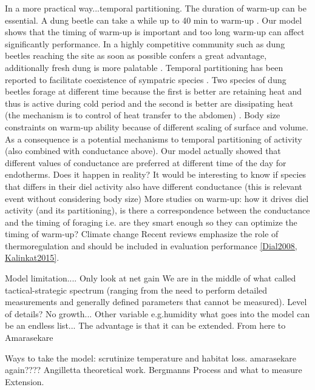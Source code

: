 In a more practical way...temporal partitioning. The duration of warm-up can be essential.
A dung beetle can take a while up to 40 min to warm-up \citep{Verdu2008}.
Our  model shows that the timing of warm-up is important and too long warm-up can affect significantly performance.
In a highly competitive community such as dung beetles reaching the site as soon as possible confers a great advantage, additionally fresh dung is more palatable \citep{Hanski1991}.
Temporal partitioning has been reported to facilitate coexistence of sympatric species \citep{Verdu2007, Verdu2012}.
Two species of dung beetles forage at different time because the first is better are retaining heat and thus is active during cold period and the second is better are dissipating heat (the mechanism is to control of heat transfer to the abdomen) \citep{Verdu2012}.
Body size constraints on warm-up ability because of different scaling of surface and volume.
As a consequence is a potential mechanisms to temporal partitioning of activity (also combined with conductance above).
Our model actually showed that different values of conductance are preferred at different time of the day for endotherms.
Does it happen in reality? %
It would be interesting to know if species that differs in their diel activity also have different conductance (this is relevant event without considering body size)  
More studies on warm-up: how it drives diel activity (and its partitioning), is there a correspondence between the conductance and the timing of foraging i.e. are they smart enough so they can optimize the timing of warm-up? 
Climate change
Recent reviews emphasize the role of thermoregulation and should be included in evaluation performance \cref{Dial2008, Kalinkat2015}.




Model limitation....
Only look at net gain
We are in the middle of what \citet{Hooling1966} called tactical-strategic spectrum (ranging from the need to perform detailed measurements and generally defined parameters that cannot be measured).
Level of details?
No growth...
Other variable e.g.humidity
what goes into the model can be an endless list...
The advantage is that it can be extended.
From here to Amarasekare

Ways to take the model:
scrutinize
temperature and habitat loss.
amarasekare again???? Angilletta theoretical work.
Bergmanns
Process and what to measure
Extension.

